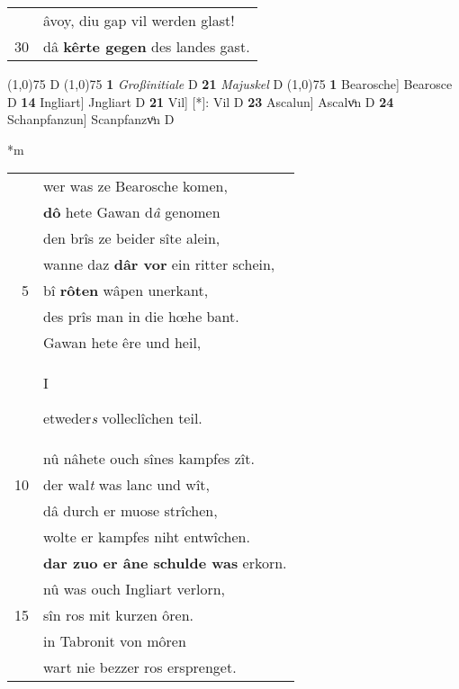 \documentclass[8pt,a4paper,notitlepage]{article}
\begin{document}
\begin{table}[ht]
\begin{minipage}[t]{0.5\linewidth}
\begin{tabular}{rl}
 & âvoy, diu gap vil werden glast!\\ 
30 & dâ \textbf{kêrte gegen} des landes gast.\\ 
\end{tabular}
\scriptsize
\line(1,0){75} \newline
D \newline
\line(1,0){75} \newline
\textbf{1} \textit{Großinitiale} D  \textbf{21} \textit{Majuskel} D  \newline
\line(1,0){75} \newline
\textbf{1} Bearosche] Bearosce D \textbf{14} Ingliart] Jngliart D \textbf{21} Vil] [*]: Vil D \textbf{23} Ascalun] Ascalvͦn D \textbf{24} Schanpfanzun] Scanpfanzvͦn D \newline
\end{minipage}
\hspace{0.5cm}
\begin{minipage}[t]{0.5\linewidth}
\small
\begin{center}*m
\end{center}
\begin{tabular}{rl}
 & wer was ze Bearosche komen,\\ 
 & \textbf{dô} hete Gawan d\textit{â} genomen\\ 
 & den brîs ze beider sîte alein,\\ 
 & wanne daz \textbf{dâr vor} ein ritter schein,\\ 
5 & bî \textbf{rôten} wâpen unerkant,\\ 
 & des prîs man in die hœhe bant.\\ 
 & Gawan hete êre und heil,\\ 
 & \begin{large}I\end{large}etweder\textit{s} volleclîchen teil.\\ 
 & nû nâhete ouch sînes kampfes zît.\\ 
10 & der wal\textit{t} was lanc und wît,\\ 
 & dâ durch er muose strîchen,\\ 
 & wolte er kampfes niht entwîchen.\\ 
 & \textbf{dar zuo er âne schulde was} erkorn.\\ 
 & nû was ouch Ingliart verlorn,\\ 
15 & sîn ros mit kurzen ôren.\\ 
 & in Tabronit von môren\\ 
 & wart nie bezzer ros ersprenget.\\ 

\end{tabular}
\end{minipage}
\end{table}
\end{document}
